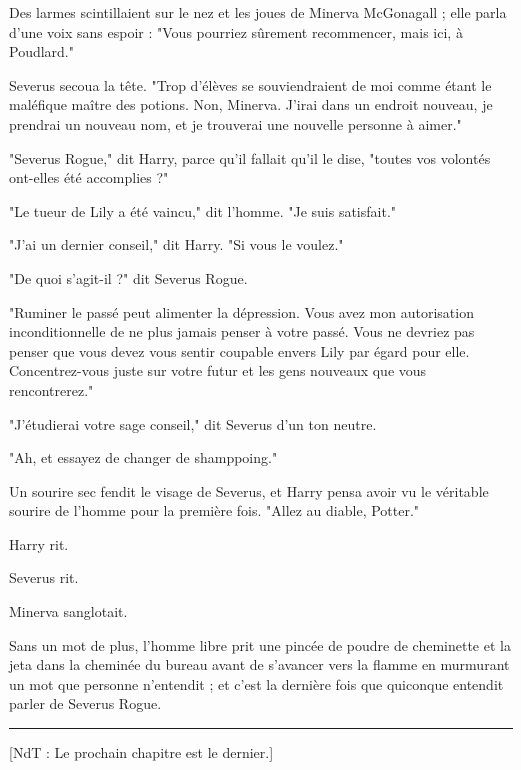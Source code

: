 Des larmes scintillaient sur le nez et les joues de Minerva McGonagall ; elle parla d'une voix sans espoir : "Vous pourriez sûrement recommencer, mais ici, à Poudlard."

Severus secoua la tête. "Trop d'élèves se souviendraient de moi comme étant le maléfique maître des potions. Non, Minerva. J'irai dans un endroit nouveau, je prendrai un nouveau nom, et je trouverai une nouvelle personne à aimer."

"Severus Rogue," dit Harry, parce qu'il fallait qu'il le dise, "toutes vos volontés ont-elles été accomplies ?"

"Le tueur de Lily a été vaincu," dit l'homme. "Je suis satisfait."

"J'ai un dernier conseil," dit Harry. "Si vous le voulez."

"De quoi s'agit-il ?" dit Severus Rogue.

"Ruminer le passé peut alimenter la dépression. Vous avez mon autorisation inconditionnelle de ne plus jamais penser à votre passé. Vous ne devriez pas penser que vous devez vous sentir coupable envers Lily par égard pour elle. Concentrez-vous juste sur votre futur et les gens nouveaux que vous rencontrerez."

"J'étudierai votre sage conseil," dit Severus d'un ton neutre.

"Ah, et essayez de changer de shamppoing."

Un sourire sec fendit le visage de Severus, et Harry pensa avoir vu le véritable sourire de l'homme pour la première fois. "Allez au diable, Potter."

Harry rit.

Severus rit.

Minerva sanglotait.

Sans un mot de plus, l'homme libre prit une pincée de poudre de cheminette et la jeta dans la cheminée du bureau avant de s'avancer vers la flamme en murmurant un mot que personne n'entendit ; et c'est la dernière fois que quiconque entendit parler de Severus Rogue.
\par\noindent\rule{\textwidth}{0.4pt}
[NdT : Le prochain chapitre est le dernier.]

